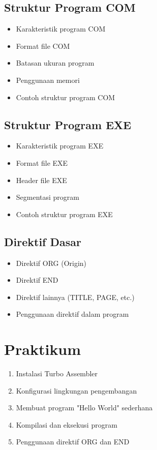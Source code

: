 \subsection{Struktur Program COM}
\begin{itemize}
\item Karakteristik program COM
\item Format file COM
\item Batasan ukuran program
\item Penggunaan memori
\item Contoh struktur program COM
\end{itemize}

\subsection{Struktur Program EXE}
\begin{itemize}
\item Karakteristik program EXE
\item Format file EXE
\item Header file EXE
\item Segmentasi program
\item Contoh struktur program EXE
\end{itemize}

\subsection{Direktif Dasar}
\begin{itemize}
\item Direktif ORG (Origin)
\item Direktif END
\item Direktif lainnya (TITLE, PAGE, etc.)
\item Penggunaan direktif dalam program
\end{itemize}

\section{Praktikum}
\begin{enumerate}
\item Instalasi Turbo Assembler
\item Konfigurasi lingkungan pengembangan
\item Membuat program "Hello World" sederhana
\item Kompilasi dan eksekusi program
\item Penggunaan direktif ORG dan END
\end{enumerate}

